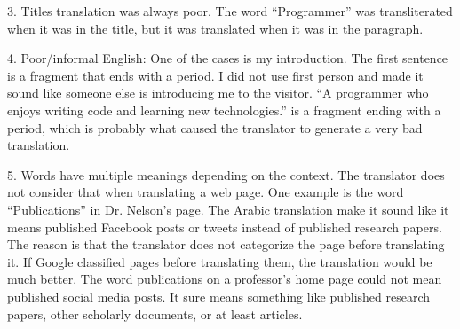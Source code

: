 3. Titles translation was always poor. The word ``Programmer'' was transliterated when it was in the title, but it was translated when it was in the paragraph.

4. Poor/informal English: One of the cases is my introduction. The first sentence is a fragment that ends with a period. I did not use first person and made it sound like someone else is introducing me to the visitor. ``A programmer who enjoys writing code and learning new technologies.'' is a fragment ending with a period, which is probably what caused the translator to generate a very bad translation.

5. Words have multiple meanings depending on the context. The translator does not consider that when translating a web page. One example is the word ``Publications'' in Dr. Nelson's page. The Arabic translation make it sound like it means published Facebook posts or tweets instead of published research papers. The reason is that the translator does not categorize the page before translating it. If Google classified pages before translating them, the translation would be much better. The word publications on a professor's home page could not mean published social media posts. It sure means something like published research papers, other scholarly documents, or at least articles.
